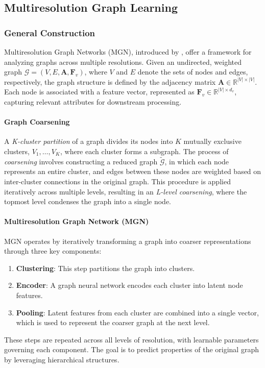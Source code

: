 \subsection{Multiresolution Graph Learning}

\subsubsection{General Construction}

Multiresolution Graph Networks (MGN), introduced by \citet{hy2019covariant}, offer a framework for analyzing graphs across multiple resolutions. Given an undirected, weighted graph \( \mathcal{G} = (V, E, \mathbf{A}, \mathbf{F}_v) \), where \( V \) and \( E \) denote the sets of nodes and edges, respectively, the graph structure is defined by the adjacency matrix \( \mathbf{A} \in \mathbb{R}^{|V| \times |V|} \). Each node is associated with a feature vector, represented as \( \mathbf{F}_v \in \mathbb{R}^{|V| \times d_v} \), capturing relevant attributes for downstream processing.

\paragraph{Graph Coarsening}
A \emph{K-cluster partition} of a graph divides its nodes into \( K \) mutually exclusive clusters, \( V_1, \ldots, V_K \), where each cluster forms a subgraph. The process of \emph{coarsening} involves constructing a reduced graph \( \widetilde{\mathcal{G}} \), in which each node represents an entire cluster, and edges between these nodes are weighted based on inter-cluster connections in the original graph. This procedure is applied iteratively across multiple levels, resulting in an \emph{L-level coarsening}, where the topmost level condenses the graph into a single node.

\paragraph{Multiresolution Graph Network (MGN)}
MGN operates by iteratively transforming a graph into coarser representations through three key components:
\begin{enumerate}
    \item \textbf{Clustering}: This step partitions the graph into clusters.
    \item \textbf{Encoder}: A graph neural network encodes each cluster into latent node features.
    \item \textbf{Pooling}: Latent features from each cluster are combined into a single vector, which is used to represent the coarser graph at the next level.
\end{enumerate}
These steps are repeated across all levels of resolution, with learnable parameters governing each component. The goal is to predict properties of the original graph by leveraging hierarchical structures.

